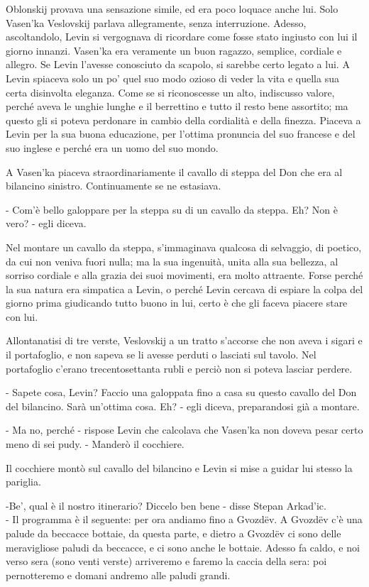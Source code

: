 Oblonskij provava una sensazione simile, ed era poco loquace anche lui. Solo Vasen'ka Veslovskij parlava allegramente, senza interruzione. Adesso, ascoltandolo, Levin si vergognava di ricordare come fosse stato ingiusto con lui il giorno innanzi. Vasen'ka era veramente un buon ragazzo, semplice, cordiale e allegro. Se Levin l'avesse conosciuto da scapolo, si sarebbe certo legato a lui. A Levin spiaceva solo un po' quel suo modo ozioso di veder la vita e quella sua certa disinvolta eleganza. Come se si riconoscesse un alto, indiscusso valore, perché aveva le unghie lunghe e il berrettino e tutto il resto bene assortito; ma questo gli si poteva perdonare in cambio della cordialità e della finezza. Piaceva a Levin per la sua buona educazione, per l'ottima pronuncia del suo francese e del suo inglese e perché era un uomo del suo mondo. 

A Vasen'ka piaceva straordinariamente il cavallo di steppa del Don che era al bilancino sinistro. Continuamente se ne estasiava. 

- Com'è bello galoppare per la steppa su di un cavallo da steppa. Eh? Non è vero? - egli diceva. 

Nel montare un cavallo da steppa, s'immaginava qualcosa di selvaggio, di poetico, da cui non veniva fuori nulla; ma la sua ingenuità, unita alla sua bellezza, al sorriso cordiale e alla grazia dei suoi movimenti, era molto attraente. Forse perché la sua natura era simpatica a Levin, o perché Levin cercava di espiare la colpa del giorno prima giudicando tutto buono in lui, certo è che gli faceva piacere stare con lui. 

Allontanatisi di tre verste, Veslovskij a un tratto s'accorse che non aveva i sigari e il portafoglio, e non sapeva se li avesse perduti o lasciati sul tavolo. Nel portafoglio c'erano trecentosettanta rubli e perciò non si poteva lasciar perdere. 

- Sapete cosa, Levin? Faccio una galoppata fino a casa su questo cavallo del Don del bilancino. Sarà un'ottima cosa. Eh? - egli diceva, preparandosi già a montare. 

- Ma no, perché - rispose Levin che calcolava che Vasen'ka non doveva pesar certo meno di sei pudy. - Manderò il cocchiere. 

Il cocchiere montò sul cavallo del bilancino e Levin si mise a guidar lui stesso la pariglia. 

-Be', qual è il nostro itinerario? Diccelo ben bene - disse Stepan Arkad'ic. \\
- Il programma è il seguente: per ora andiamo fino a Gvozdëv. A Gvozdëv c'è una palude da beccacce bottaie, da questa parte, e dietro a Gvozdëv ci sono delle meravigliose paludi da beccacce, e ci sono anche le bottaie. Adesso fa caldo, e noi verso sera (sono venti verste) arriveremo e faremo la caccia della sera: poi pernotteremo e domani andremo alle paludi grandi. 

